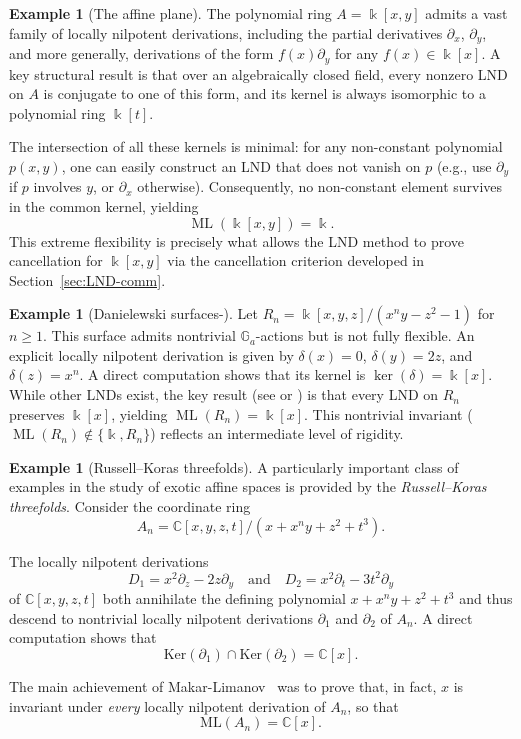 \documentclass{amsart}
\theoremstyle{plain}
\numberwithin{theorem}{section}
\numberwithin{equation}{theorem}
\theoremstyle{definition}
\newtheorem{example}[theorem]{Example}
\DeclareMathOperator{\ML}{ML}
\begin{document}
\begin{example}[The affine plane]\label{ex:affine-plane-concise}
The polynomial ring $A = \Bbbk[x,y]$ admits a vast family of locally nilpotent derivations, including the partial derivatives $\partial_x$, $\partial_y$, and more generally, derivations of the form $f(x)\partial_y$ for any $f(x) \in \Bbbk[x]$. A key structural result \cite{ Freudenburg2006,ML} is that over an algebraically closed field, every nonzero LND on $A$ is conjugate to one of this form, and its kernel is always isomorphic to a polynomial ring $\Bbbk[t]$.

The intersection of all these kernels is minimal: for any non-constant polynomial $p(x,y)$, one can easily construct an LND that does not vanish on $p$ (e.g., use $\partial_y$ if $p$ involves $y$, or $\partial_x$ otherwise). Consequently, no non-constant element survives in the common kernel, yielding
\[
    \ML(\Bbbk[x,y]) = \Bbbk.
\]
This extreme flexibility is precisely what allows the LND method to prove cancellation for $\Bbbk[x,y]$ via the cancellation criterion developed in Section~\ref{sec:LND-comm}.
\end{example}

\begin{example}[Danielewski surfaces-\cite{Da}]\label{ex:danielewski-concise}
Let $R_n = \Bbbk[x,y,z]/(x^ny - z^{2} - 1)$ for $n\geq 1$. This surface admits nontrivial $\mathbb{G}_a$-actions but is not fully flexible. An explicit locally nilpotent derivation is given by $\delta(x) = 0$, $\delta(y) = 2z$, and $\delta(z)=x^n$. A direct computation shows that its kernel is $\ker(\delta) = \Bbbk[x]$. While other LNDs exist, the key result (see \cite[Theorem 3.4]{Da} or \cite[Example 2.2]{Crachiola2009}) is that every LND on $R_n$ preserves $\Bbbk[x]$, yielding $\ML(R_n) = \Bbbk[x]$. This nontrivial invariant ($\ML(R_n) \notin \{\Bbbk, R_n\}$) reflects an intermediate level of rigidity.

\end{example}




\begin{example}[Russell–Koras threefolds] \label{Russell-Koras} A particularly important class of examples in the study of exotic affine spaces is provided by the \emph{Russell–Koras threefolds}. 
Consider the  coordinate ring 
\[
A_{n} = \mathbb{C}[x,y,z,t]/(x + x^n y + z^2 + t^3).
\]

The locally nilpotent derivations
\[
D_1 = x^2 \partial_z - 2z \partial_y \quad \text{and} \quad D_2 = x^2 \partial_t - 3t^2 \partial_y
\]
of $\mathbb{C}[x,y,z,t]$ both annihilate the defining polynomial $x + x^n y + z^2 + t^3$ and thus descend to nontrivial locally nilpotent derivations $\partial_1$ and $\partial_2$ of $A_{n}$. A direct computation shows that
\[
\mathrm{Ker}(\partial_1) \cap \mathrm{Ker}(\partial_2) = \mathbb{C}[x].
\]

The main achievement of Makar-Limanov~\cite{MakarLimanov1996} was to prove that, in fact, $x$ is invariant under \emph{every} locally nilpotent derivation of $A_{n}$, so that
\[
\mathrm{ML}(A_n) = \mathbb{C}[x].
\]



\end{example}
\end{document}
